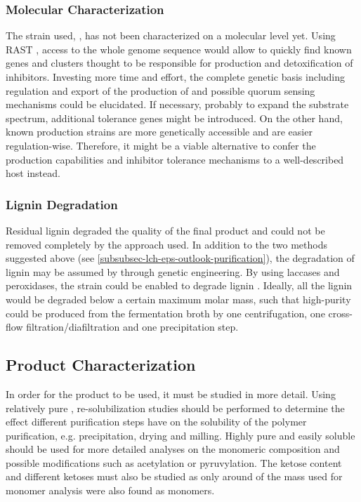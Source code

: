 \subsubsection{Molecular Characterization}
The strain used, \strain{}, has not been characterized on a molecular level yet. Using RAST \cite{Aziz2008, Overbeek2014, Brettin2015}, access to the whole genome sequence would allow to quickly find known genes and clusters thought to be responsible for \eps{} production and detoxification of inhibitors. Investing more time and effort, the complete genetic basis including regulation and export of the \eps{} production of \strain{} and possible quorum sensing mechanisms could be elucidated. If necessary, probably to expand the substrate spectrum, additional tolerance genes might be introduced. On the other hand, known production strains are more genetically accessible and are easier regulation-wise. Therefore, it might be a viable alternative to confer the \eps{} production capabilities and inhibitor tolerance mechanisms to a well-described host instead.

\subsubsection{Lignin Degradation\label{subsubsec-lch-eps-outlook-strain-lignin}}
Residual lignin degraded the quality of the final product and could not be removed completely by the approach used. In addition to the two methods suggested above (see \vref{subsubsec-lch-eps-outlook-purification}), the degradation of lignin may be assumed by \strain{} through genetic engineering. By using laccases and peroxidases, the strain could be enabled to degrade lignin \cite{Xu2014}. Ideally, all the lignin would be degraded below a certain maximum molar mass, such that high-purity \eps{} could be produced from the fermentation broth by one centrifugation, one cross-flow filtration/diafiltration and one precipitation step.

\subsection{Product Characterization}
In order for the product to be used, it must be studied in more detail. Using relatively pure \eps{}, re-solubilization studies should be performed to determine the effect different purification steps have on the solubility of the polymer purification, e.g. precipitation, drying and milling. Highly pure and easily soluble \eps{} should be used for more detailed analyses on the monomeric composition and possible modifications such as acetylation or pyruvylation. The ketose content and different ketoses must also be studied as only around  of the mass used for monomer analysis were also found as monomers.

